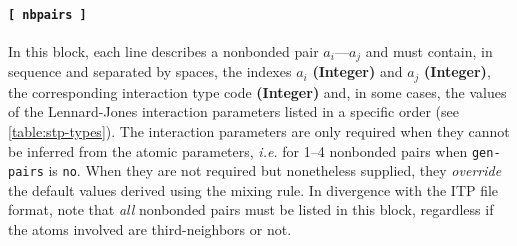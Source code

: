 \documentclass[10pt,a4paper,openany]{memoir}
\numberwithin{equation}{section}
\begin{document}
\paragraph{\texttt{[~nbpairs~]}}



In this block, each line describes a nonbonded pair $a_i$---$a_j$ and
must contain, in sequence and separated by spaces, the indexes $a_i$
\textbf{(Integer)} and $a_j$ \textbf{(Integer)}, the corresponding
interaction type code \textbf{(Integer)} and, in some cases, the
values of the Lennard-Jones interaction parameters listed in a
specific order (see \autoref{table:stp-types}).  The interaction
parameters are only required when they cannot be inferred from the
atomic parameters, \textit{i.e.} for 1--4 nonbonded pairs when
\texttt{gen-pairs} is \texttt{no}. When they are not required but
nonetheless supplied, they \textit{override} the default values
derived using the mixing rule.  In divergence with the ITP file
format, note that \textit{all} nonbonded pairs must be listed in this
block, regardless if the atoms involved are third-neighbors or not.
\end{document}
